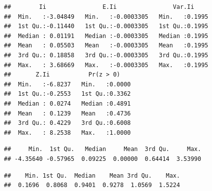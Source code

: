 \documentclass[11pt,]{article}
\newenvironment{Shaded}{\begin{snugshade}}{\end{snugshade}}
\newcommand{\KeywordTok}[1]{\textcolor[rgb]{0.13,0.29,0.53}{\textbf{#1}}}
\newcommand{\StringTok}[1]{\textcolor[rgb]{0.31,0.60,0.02}{#1}}
\newcommand{\OperatorTok}[1]{\textcolor[rgb]{0.81,0.36,0.00}{\textbf{#1}}}
\newcommand{\NormalTok}[1]{#1}
\begin{document}
\begin{verbatim}
##        Ii                E.Ii                Var.Ii      
##  Min.   :-3.04849   Min.   :-0.0003305   Min.   :0.1995  
##  1st Qu.:-0.11440   1st Qu.:-0.0003305   1st Qu.:0.1995  
##  Median : 0.01191   Median :-0.0003305   Median :0.1995  
##  Mean   : 0.05503   Mean   :-0.0003305   Mean   :0.1995  
##  3rd Qu.: 0.18858   3rd Qu.:-0.0003305   3rd Qu.:0.1995  
##  Max.   : 3.68669   Max.   :-0.0003305   Max.   :0.1995  
##       Z.Ii           Pr(z > 0)     
##  Min.   :-6.8237   Min.   :0.0000  
##  1st Qu.:-0.2553   1st Qu.:0.3362  
##  Median : 0.0274   Median :0.4891  
##  Mean   : 0.1239   Mean   :0.4736  
##  3rd Qu.: 0.4229   3rd Qu.:0.6008  
##  Max.   : 8.2538   Max.   :1.0000
\end{verbatim}

\begin{Shaded}
\end{Shaded}

\begin{verbatim}
##     Min.  1st Qu.   Median     Mean  3rd Qu.     Max. 
## -4.35640 -0.57965  0.09225  0.00000  0.64414  3.53990
\end{verbatim}

\begin{Shaded}
\end{Shaded}

\begin{verbatim}
##    Min. 1st Qu.  Median    Mean 3rd Qu.    Max. 
##  0.1696  0.8068  0.9401  0.9278  1.0569  1.5224
\end{verbatim}

\begin{Shaded}
\end{Shaded}
\end{document}
